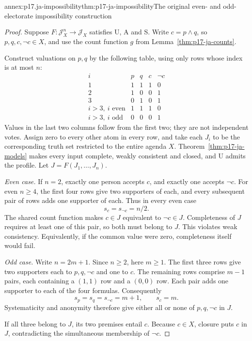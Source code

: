 \begin{annexitem}{annex:p17.ja-impossibility}{thm:p17-ja-impossibility}{The original even- and odd-electorate impossibility construction}
\begin{proof}
Suppose \(F:\mathcal J_X^n\to\mathcal J_X\) satisfies U, A and S. Write
\(c=p\land q\), so \(p,q,c,\neg c\in X\), and use the count function
\(g\) from Lemma~\ref{thm:p17-ja-counts}.

Construct valuations on \(p,q\) by the following table, using only rows whose
index is at most \(n\):
\[
 \begin{array}{c|cccc}
 i& p&q&c&\neg c\\ \hline
 1&1&1&1&0\\
 2&1&0&0&1\\
 3&0&1&0&1\\
 i>3,\ i\text{ even}&1&1&1&0\\
 i>3,\ i\text{ odd}&0&0&0&1
 \end{array}
\]
Values in the last two columns follow from the first two; they are not
independent votes. Assign zero to every other atom in every row, and take
each \(J_i\) to be the corresponding truth set restricted to the entire
agenda \(X\). Theorem~\ref{thm:p17-ja-models} makes every input complete,
weakly consistent and closed, and U admits the profile. Let
\(J=F(J_1,\ldots,J_n)\).

\emph{Even case.} If \(n=2\), exactly one person accepts \(c\), and exactly
one accepts \(\neg c\). For even \(n\geq4\), the first four rows give two
supporters of each, and every subsequent pair of rows adds one supporter of
each. Thus in every even case
\[
 s_c=s_{\neg c}=n/2.
\]
The shared count function makes \(c\in J\) equivalent to \(\neg c\in J\).
Completeness of \(J\) requires at least one of this pair, so both must belong
to \(J\). This violates weak consistency. Equivalently, if the common value
were zero, completeness itself would fail.

\emph{Odd case.} Write \(n=2m+1\). Since \(n\geq2\), here \(m\geq1\).
The first three rows give two supporters each to \(p,q,\neg c\) and one to
\(c\). The remaining rows comprise \(m-1\) pairs, each containing a
\((1,1)\) row and a \((0,0)\) row. Each pair adds one supporter to each of
the four formulas. Consequently
\[
 s_p=s_q=s_{\neg c}=m+1,\qquad s_c=m.
\]
Systematicity and anonymity therefore give either all or none of
\(p,q,\neg c\) in \(J\).

If all three belong to \(J\), its two premises entail \(c\). Because
\(c\in X\), closure puts \(c\) in \(J\), contradicting the simultaneous
membership of \(\neg c\).


\end{proof}
\end{annexitem}
